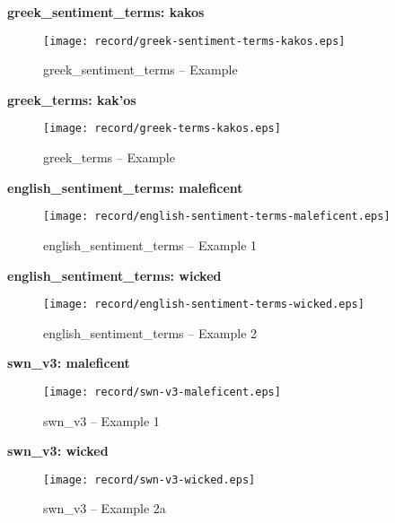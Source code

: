 \textbf{greek\_sentiment\_terms: \textgreek{kakos}} \\

\begin{figure}[ht]
\centering
\texttt{[image: record/greek-sentiment-terms-kakos.eps]}
\caption{greek\_sentiment\_terms -- Example}
\label{fig:gst-kakos}
\end{figure}

\clearpage

\textbf{greek\_terms: \textgreek{kak'os}} \\

\begin{figure}[ht]
\centering
\texttt{[image: record/greek-terms-kakos.eps]}
\caption{greek\_terms -- Example}
\label{fig:gt-kakos}
\end{figure}

\clearpage

\textbf{english\_sentiment\_terms: maleficent} \\

\begin{figure}[ht]
\centering
\texttt{[image: record/english-sentiment-terms-maleficent.eps]}
\caption{english\_sentiment\_terms -- Example 1}
\label{fig:est-maleficent}
\end{figure}

\clearpage

\textbf{english\_sentiment\_terms: wicked} \\

\begin{figure}[ht]
\centering
\texttt{[image: record/english-sentiment-terms-wicked.eps]}
\caption{english\_sentiment\_terms -- Example 2}
\label{fig:est-wicked}
\end{figure}

\clearpage

\textbf{swn\_v3: maleficent} \\

\begin{figure}[ht]
\centering
\texttt{[image: record/swn-v3-maleficent.eps]}
\caption{swn\_v3 -- Example 1}
\label{fig:swn-maleficent}
\end{figure}

\clearpage

\textbf{swn\_v3: wicked} \\

\begin{figure}[ht]
\centering
\texttt{[image: record/swn-v3-wicked.eps]}
\caption{swn\_v3 -- Example 2a}
\label{fig:swn-wicked}
\end{figure}

